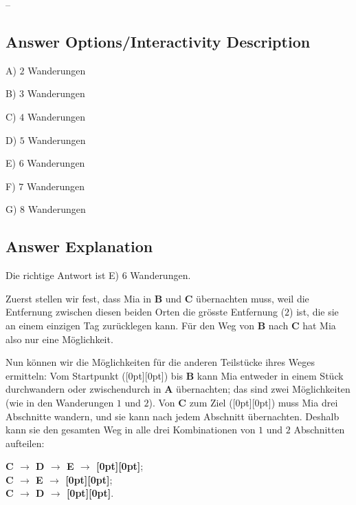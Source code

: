 \documentclass[a4paper,11pt]{report}
\makeatletter
\renewenvironment{adjustwidth}[2]{%
    \begin{list}{}{%
    \partopsep\z@%
    \topsep\z@%
    \listparindent\parindent%
    \parsep\parskip%
    \@ifmtarg{#1}{\setlength{\leftmargin}{\z@}}%
                 {\setlength{\leftmargin}{#1}}%
    \@ifmtarg{#2}{\setlength{\rightmargin}{\z@}}%
                 {\setlength{\rightmargin}{#2}}%
    }
    \item[]}{\end{list}}
\newcommand{\taskGraphicsFolder}{..}
\makeatother
\begin{document}
–

\begingroup
\renewcommand{\arraystretch}{1.5}
\subsection*{Answer Options/Interactivity Description}

A) $2$ Wanderungen

B) $3$ Wanderungen

C) $4$ Wanderungen

D) $5$ Wanderungen

E) $6$ Wanderungen

F) $7$ Wanderungen

G) $8$ Wanderungen

\endgroup

\subsection*{Answer Explanation}

Die richtige Antwort ist E) $6$ Wanderungen.

{\centering%
\par}

Zuerst stellen wir fest, dass Mia in \textbf{B} und \textbf{C} übernachten muss, weil die Entfernung zwischen diesen beiden Orten die grösste Entfernung ($2$) ist, die sie an einem einzigen Tag zurücklegen kann.  Für den Weg von \textbf{B} nach \textbf{C} hat Mia also nur eine Möglichkeit.

Nun können wir die Möglichkeiten für die anderen Teilstücke ihres Weges ermitteln:  Vom Startpunkt (\raisebox{-0.5ex}[0pt][0pt]{}) bis \textbf{B} kann Mia entweder in einem Stück durchwandern oder zwischendurch in \textbf{A} übernachten; das sind zwei Möglichkeiten (wie in den Wanderungen $1$ und $2$). Von \textbf{C} zum Ziel (\raisebox{-0.5ex}[0pt][0pt]{}) muss Mia drei Abschnitte wandern, und sie kann nach jedem Abschnitt übernachten.  Deshalb kann sie den gesamten Weg in alle drei Kombinationen von $1$ und $2$ Abschnitten aufteilen:

\begin{adjustwidth}{1.5em}{0em}
\textbf{C \ensuremath{\rightarrow} D \ensuremath{\rightarrow} E \ensuremath{\rightarrow} \raisebox{-0.5ex}[0pt][0pt]{}};  \\
\textbf{C \ensuremath{\rightarrow} E \ensuremath{\rightarrow} \raisebox{-0.5ex}[0pt][0pt]{}};      \\
\textbf{C \ensuremath{\rightarrow} D \ensuremath{\rightarrow} \raisebox{-0.5ex}[0pt][0pt]{}}.
\end{adjustwidth}
\end{document}
